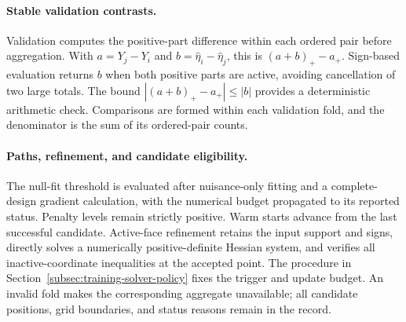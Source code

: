 \paragraph{Stable validation contrasts.}
Validation computes the positive-part difference within each ordered pair before aggregation. With $a=Y_j-Y_i$ and $b=\widehat\eta_i-\widehat\eta_j$, this is $(a+b)_+-a_+$. Sign-based evaluation returns $b$ when both positive parts are active, avoiding cancellation of two large totals. The bound $|(a+b)_+-a_+|\le |b|$ provides a deterministic arithmetic check. Comparisons are formed within each validation fold, and the denominator is the sum of its ordered-pair counts.

\paragraph{Paths, refinement, and candidate eligibility.}
The null-fit threshold is evaluated after nuisance-only fitting and a complete-design gradient calculation, with the numerical budget propagated to its reported status. Penalty levels remain strictly positive. Warm starts advance from the last successful candidate. Active-face refinement retains the input support and signs, directly solves a numerically positive-definite Hessian system, and verifies all inactive-coordinate inequalities at the accepted point. The procedure in Section~\ref{subsec:training-solver-policy} fixes the trigger and update budget. An invalid fold makes the corresponding aggregate unavailable; all candidate positions, grid boundaries, and status reasons remain in the record.
